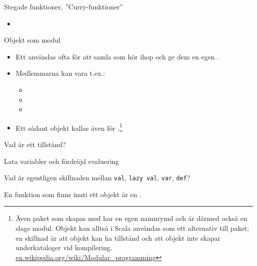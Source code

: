 \begin{Slide}{Stegade funktioner, ''Curry-funktioner''}
\begin{itemize}
\item 
\end{itemize}
\end{Slide} 






\begin{Slide}{Objekt som modul}
\begin{itemize}
\item Ett  användas ofta för att samla  som hör ihop och ge dem en egen . 
\item Medlemmarna kan vara t.ex.: 
\begin{itemize}
\item  {} \item {} \item {} 
\end{itemize}
\item Ett sådant objekt kallas även för .\footnote{
Även paket som skapas med  har en egen namnrymd och är därmed också en slags modul. Objekt kan alltså i Scala användas som ett alternativ till paket; en skillnad är att objekt kan ha tillstånd och att objekt inte skapar underkataloger vid kompilering.  \href{https://en.wikipedia.org/wiki/Modular_programming}{en.wikipedia.org/wiki/Modular\_programming}}

\end{itemize}

\end{Slide}


\begin{Slide}{Vad är ett tillstånd?} 
\end{Slide} 

\begin{Slide}{Lata variabler och fördröjd evaluering} 
\end{Slide} 

\begin{Slide}{Vad är egentligen skillnaden mellan \texttt{val}, \texttt{lazy val}, \texttt{var}, \texttt{def}?} 

En funktion som finns inuti ett objekt är en .
\end{Slide} 



